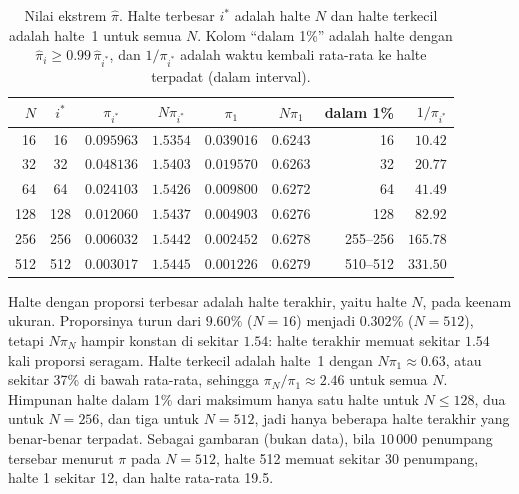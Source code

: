 \documentclass[12pt,a4paper]{article}
\numberwithin{equation}{section}
\begin{document}
\begin{table}[H]
\centering
\caption{Nilai ekstrem $\hat\pi$. Halte terbesar $i^\ast$ adalah halte $N$ dan halte terkecil adalah halte~1 untuk
semua $N$. Kolom ``dalam 1\%'' adalah halte dengan $\hat\pi_i\ge0.99\,\hat\pi_{i^\ast}$, dan $1/\pi_{i^\ast}$ adalah
waktu kembali rata-rata ke halte terpadat (dalam interval).}
\label{tab:interpretasi}
\small
\setlength{\tabcolsep}{4pt}
\begin{tabular}{rcccccrr}
\toprule
$N$ & $i^\ast$ & $\pi_{i^\ast}$ & $N\pi_{i^\ast}$ & $\pi_1$ & $N\pi_1$ & dalam 1\% & $1/\pi_{i^\ast}$\\
\midrule
16 & 16 & $0.095963$ & $1.5354$ & $0.039016$ & $0.6243$ & 16 & $10.42$ \\
32 & 32 & $0.048136$ & $1.5403$ & $0.019570$ & $0.6263$ & 32 & $20.77$ \\
64 & 64 & $0.024103$ & $1.5426$ & $0.009800$ & $0.6272$ & 64 & $41.49$ \\
128 & 128 & $0.012060$ & $1.5437$ & $0.004903$ & $0.6276$ & 128 & $82.92$ \\
256 & 256 & $0.006032$ & $1.5442$ & $0.002452$ & $0.6278$ & 255--256 & $165.78$ \\
512 & 512 & $0.003017$ & $1.5445$ & $0.001226$ & $0.6279$ & 510--512 & $331.50$ \\
\bottomrule
\end{tabular}
\end{table}

Halte dengan proporsi terbesar adalah halte terakhir, yaitu halte $N$, pada keenam ukuran. Proporsinya turun dari
$9.60\%$ ($N=16$) menjadi $0.302\%$ ($N=512$), tetapi $N\pi_N$ hampir konstan di sekitar $1.54$: halte terakhir memuat
sekitar $1.54$ kali proporsi seragam. Halte terkecil adalah halte~1 dengan $N\pi_1\approx0.63$, atau sekitar 37\% di
bawah rata-rata, sehingga $\pi_N/\pi_1\approx2.46$ untuk semua $N$. Himpunan halte dalam 1\% dari maksimum hanya satu
halte untuk $N\le128$, dua untuk $N=256$, dan tiga untuk $N=512$, jadi hanya beberapa halte terakhir yang benar-benar
terpadat. Sebagai gambaran (bukan data), bila $10\,000$ penumpang tersebar menurut $\pi$ pada $N=512$, halte 512 memuat
sekitar 30 penumpang, halte 1 sekitar 12, dan halte rata-rata 19.5.
\end{document}
